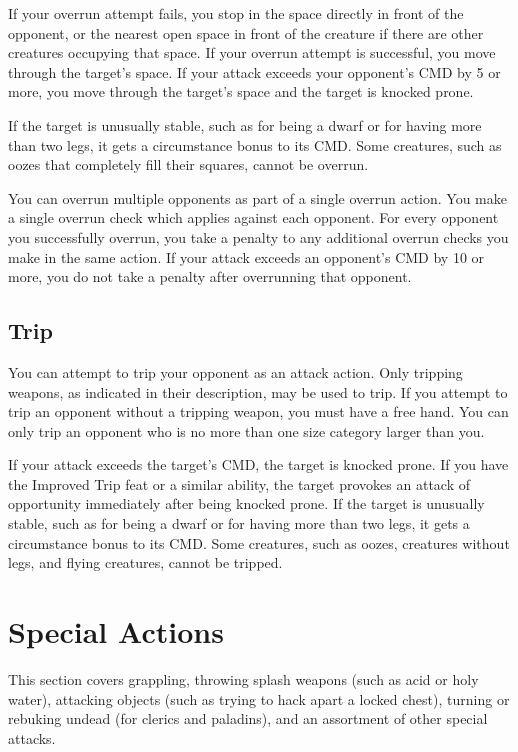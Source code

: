 If your overrun attempt fails, you stop in the space directly in front of the opponent, or the nearest open space in front of the creature if there are other creatures occupying that space. If your overrun attempt is successful, you move through the target's space. If your attack exceeds your opponent's CMD by 5 or more, you move through the target's space and the target is knocked prone.

If the target is unusually stable, such as for being a dwarf or for having more than two legs, it gets a  circumstance bonus to its CMD. Some creatures, such as oozes that completely fill their squares, cannot be overrun.

You can overrun multiple opponents as part of a single overrun action. You make a single overrun check which applies against each opponent. For every opponent you successfully overrun, you take a  penalty to any additional overrun checks you make in the same action. If your attack exceeds an opponent's CMD by 10 or more, you do not take a penalty after overrunning that opponent.

\subsection{Trip}
You can attempt to trip your opponent as an attack action. Only tripping weapons, as indicated in their description, may be used to trip. If you attempt to trip an opponent without a tripping weapon, you must have a free hand. You can only trip an opponent who is no more than one size category larger than you.

If your attack exceeds the target's CMD, the target is knocked prone. If you have the Improved Trip feat or a similar ability, the target provokes an attack of opportunity immediately after being knocked prone. If the target is unusually stable, such as for being a dwarf or for having more than two legs, it gets a  circumstance bonus to its CMD. Some creatures, such as oozes, creatures without legs, and flying creatures, cannot be tripped.

\section{Special Actions}
This section covers grappling, throwing splash weapons (such as
acid or holy water), attacking objects (such as trying to hack apart a
locked chest), turning or rebuking undead (for clerics and paladins),
and an assortment of other special attacks.

